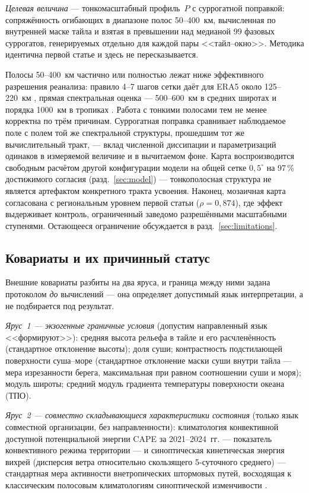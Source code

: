\documentclass[11pt,a4paper]{article}
\begin{document}
\emph{Целевая величина} --- тонкомасштабный профиль~$P$ с суррогатной поправкой: сопряжённость огибающих в диапазоне полос 50--400~км, вычисленная по внутренней маске тайла и взятая в превышении над медианой 99 фазовых суррогатов, генерируемых отдельно для каждой пары <<тайл--окно>>. Методика идентична первой статье и здесь не пересказывается.

Полосы 50--400~км частично или полностью лежат ниже эффективного разрешения реанализа: правило 4--7 шагов сетки даёт для ERA5 около 125--220~км \cite{Skamarock2004}, прямая спектральная оценка --- 500--600~км в средних широтах и порядка 1000~км в тропиках \cite{Bolgiani2022}. Работа с тонкими полосами тем не менее корректна по трём причинам. Суррогатная поправка сравнивает наблюдаемое поле с полем той же спектральной структуры, прошедшим тот же вычислительный тракт, --- вклад численной диссипации и параметризаций одинаков в измеряемой величине и в вычитаемом фоне. Карта воспроизводится свободным расчётом другой конфигурации модели на общей сетке $0{,}5^\circ$ на 97\,\% достижимого согласия (разд.~\ref{sec:model}) --- тонкополосная структура не является артефактом конкретного тракта усвоения. Наконец, мозаичная карта согласована с региональным уровнем первой статьи ($\rho=0{,}874$), где эффект выдерживает контроль, ограниченный заведомо разрешёнными масштабными ступенями. Остающееся ограничение обсуждается в разд.~\ref{sec:limitations}.

\subsection{Ковариаты и их причинный статус}

Внешние ковариаты разбиты на два яруса, и граница между ними задана протоколом \emph{до} вычислений --- она определяет допустимый язык интерпретации, а не подбирается под результат.

\emph{Ярус~1 --- экзогенные граничные условия} (допустим направленный язык <<формируют>>): средняя высота рельефа в тайле и его расчленённость (стандартное отклонение высоты); доля суши; контрастность подстилающей поверхности суша--море (стандартное отклонение маски суши внутри тайла --- мера изрезанности берега, максимальная при равном соотношении суши и моря); модуль широты; средний модуль градиента температуры поверхности океана (ТПО).

\emph{Ярус~2 --- совместно складывающиеся характеристики состояния} (только язык совместной организации, без направленности): климатология конвективной доступной потенциальной энергии CAPE за 2021--2024~гг. \cite{RiemannCampe2009} --- показатель конвективного режима территории --- и синоптическая кинетическая энергия вихрей (дисперсия ветра относительно скользящего 5-суточного среднего) --- стандартная мера активности внетропических штормовых путей, восходящая к классическим полосовым климатологиям синоптической изменчивости \cite{Blackmon1976,HoskinsHodges2005,HoskinsHodges2019}.
\end{document}
